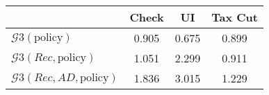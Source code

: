 \begin{tabular}{@{}lccc@{}} 
\toprule 
                          & Check      & UI    & Tax Cut    \\  \midrule 
$\mathcal{G}3(\text{policy})$ & 0.905  & 0.675  & 0.899     \\ 
$\mathcal{G}3(Rec,\text{policy})$ & 1.051  & 2.299  & 0.911     \\ 
$\mathcal{G}3(Rec, AD,\text{policy})$ & 1.836  & 3.015  & 1.229     \\ 
\end{tabular}  
